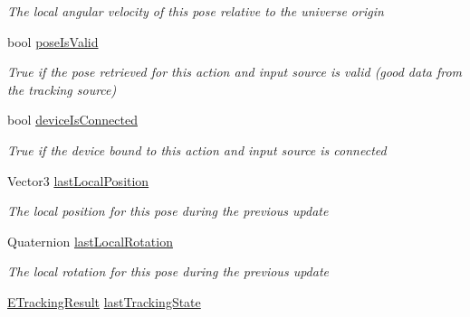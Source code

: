 \begin{DoxyCompactItemize}
\begin{DoxyCompactList}\small\item\em The local angular velocity of this pose relative to the universe origin \end{DoxyCompactList}\item 
bool \mbox{\hyperlink{interface_valve_1_1_v_r_1_1_i_steam_v_r___action___pose_ae23cc436bf3b70f17a7f3b46be350853}{pose\+Is\+Valid}}
\begin{DoxyCompactList}\small\item\em True if the pose retrieved for this action and input source is valid (good data from the tracking source) \end{DoxyCompactList}\item 
bool \mbox{\hyperlink{interface_valve_1_1_v_r_1_1_i_steam_v_r___action___pose_acc2b4cbb97eb5fc582f82eaf48134daf}{device\+Is\+Connected}}
\begin{DoxyCompactList}\small\item\em True if the device bound to this action and input source is connected \end{DoxyCompactList}\item 
Vector3 \mbox{\hyperlink{interface_valve_1_1_v_r_1_1_i_steam_v_r___action___pose_a183bdae7febd2ac8c78d3b3912eb9f72}{last\+Local\+Position}}
\begin{DoxyCompactList}\small\item\em The local position for this pose during the previous update \end{DoxyCompactList}\item 
Quaternion \mbox{\hyperlink{interface_valve_1_1_v_r_1_1_i_steam_v_r___action___pose_aa132a0b4f55cd4b11a6ca99965835343}{last\+Local\+Rotation}}
\begin{DoxyCompactList}\small\item\em The local rotation for this pose during the previous update \end{DoxyCompactList}\item 
\mbox{\hyperlink{namespace_valve_1_1_v_r_abe6feab98f33191b7c27b4292012e90a}{E\+Tracking\+Result}} \mbox{\hyperlink{interface_valve_1_1_v_r_1_1_i_steam_v_r___action___pose_a83d1cfa62995bc1b06fefb47923baff6}{last\+Tracking\+State}}

\end{DoxyCompactItemize}
